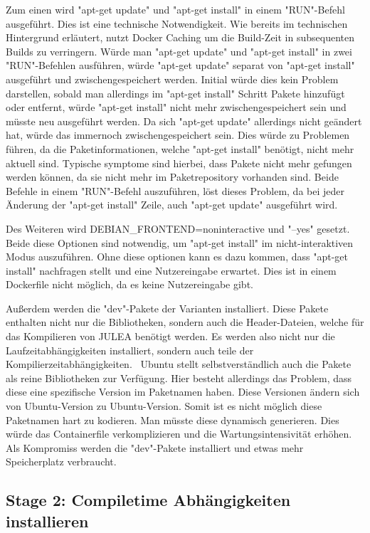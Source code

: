 Zum einen wird "apt-get update" und "apt-get install" in einem "RUN"-Befehl ausgeführt. Dies ist eine technische Notwendigkeit. Wie bereits im technischen Hintergrund erläutert, nutzt Docker Caching um die Build-Zeit in subsequenten Builds zu verringern. Würde man "apt-get update" und "apt-get install" in zwei "RUN"-Befehlen ausführen, würde "apt-get update" separat von "apt-get install" ausgeführt und zwischengespeichert werden. Initial würde dies kein Problem darstellen, sobald man allerdings im "apt-get install" Schritt Pakete hinzufügt oder entfernt, würde "apt-get install" nicht mehr zwischengespeichert sein und müsste neu ausgeführt werden. Da sich "apt-get update" allerdings nicht geändert hat, würde das immernoch zwischengespeichert sein. Dies würde zu Problemen führen, da die Paketinformationen, welche "apt-get install" benötigt, nicht mehr aktuell sind. Typische symptome sind hierbei, dass Pakete nicht mehr gefungen werden können, da sie nicht mehr im Paketrepository vorhanden sind. Beide Befehle in einem "RUN"-Befehl auszuführen, löst dieses Problem, da bei jeder Änderung der "apt-get install" Zeile, auch "apt-get update" ausgeführt wird.

Des Weiteren wird DEBIAN\_FRONTEND=noninteractive und "--yes" gesetzt. Beide diese Optionen sind notwendig, um "apt-get install" im nicht-interaktiven Modus auszuführen. Ohne diese optionen kann es dazu kommen, dass "apt-get install" nachfragen stellt und eine Nutzereingabe erwartet. Dies ist in einem Dockerfile nicht möglich, da es keine Nutzereingabe gibt.

Außerdem werden die "dev"-Pakete der Varianten installiert. Diese Pakete enthalten nicht nur die Bibliotheken, sondern auch die Header-Dateien, welche für das Kompilieren von JULEA benötigt werden. Es werden also nicht nur die Laufzeitabhängigkeiten installiert, sondern auch teile der Kompilierzeitabhängigkeiten. \
Ubuntu stellt selbstverständlich auch die Pakete als reine Bibliotheken zur Verfügung. Hier besteht allerdings das Problem, dass diese eine spezifische Version im Paketnamen haben. Diese Versionen ändern sich von Ubuntu-Version zu Ubuntu-Version. Somit ist es nicht möglich diese Paketnamen hart zu kodieren. Man müsste diese dynamisch generieren. Dies würde das Containerfile verkomplizieren und die Wartungsintensivität erhöhen. Als Kompromiss werden die "dev"-Pakete installiert und etwas mehr Speicherplatz verbraucht.

\pagebreak

\subsection{Stage 2: Compiletime Abhängigkeiten installieren} \label{sec:system-stage-2}

